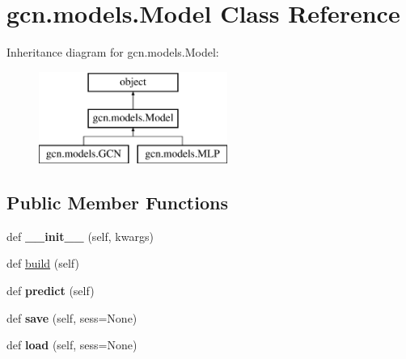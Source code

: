 \hypertarget{classgcn_1_1models_1_1Model}{}\section{gcn.\+models.\+Model Class Reference}
\label{classgcn_1_1models_1_1Model}
Inheritance diagram for gcn.\+models.\+Model\+:\begin{figure}[H]
\begin{center}
\leavevmode
\includegraphics[height=3.000000cm]{classgcn_1_1models_1_1Model}
\end{center}
\end{figure}
\subsection*{Public Member Functions}
\begin{DoxyCompactItemize}
\item 
\mbox{\label{classgcn_1_1models_1_1Model_ac3278d9ea6ae7e4fb045d57a3cbe4e14}} 
def {\bfseries \+\_\+\+\_\+init\+\_\+\+\_\+} (self, kwargs)
\item 
def \mbox{\hyperlink{classgcn_1_1models_1_1Model_aee837dd0068d34def4494f1c8176fd21}{build}} (self)
\item 
\mbox{\label{classgcn_1_1models_1_1Model_ac24bb23ad052153e1122c5b15b5d6090}} 
def {\bfseries predict} (self)
\item 
\mbox{\label{classgcn_1_1models_1_1Model_a0ae8e6c156b71d177c91bde9dc70881b}} 
def {\bfseries save} (self, sess=None)
\item 
\mbox{\label{classgcn_1_1models_1_1Model_afdf38f655db0c380614f02fd7371f635}} 
def {\bfseries load} (self, sess=None)
\end{DoxyCompactItemize}
